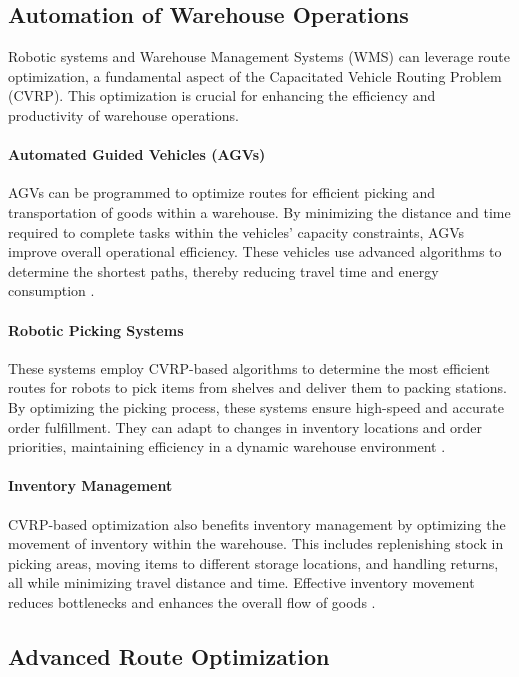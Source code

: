 \documentclass{article}
\begin{document}
    \subsection{Automation of Warehouse Operations}\label{subsec:automation-of-warehouse-operations}

    Robotic systems and Warehouse Management Systems (WMS) can leverage route optimization, a fundamental aspect of the Capacitated Vehicle Routing Problem (CVRP). This optimization is crucial for enhancing the efficiency and productivity of warehouse operations.

    \paragraph{Automated Guided Vehicles (AGVs)}
    AGVs can be programmed to optimize routes for efficient picking and transportation of goods within a warehouse. By minimizing the distance and time required to complete tasks within the vehicles' capacity constraints, AGVs improve overall operational efficiency. These vehicles use advanced algorithms to determine the shortest paths, thereby reducing travel time and energy consumption . \cite{toth2014vehicle}

    \paragraph{Robotic Picking Systems}
    These systems employ CVRP-based algorithms to determine the most efficient routes for robots to pick items from shelves and deliver them to packing stations. By optimizing the picking process, these systems ensure high-speed and accurate order fulfillment. They can adapt to changes in inventory locations and order priorities, maintaining efficiency in a dynamic warehouse environment .

    \paragraph{Inventory Management}
    CVRP-based optimization also benefits inventory management by optimizing the movement of inventory within the warehouse. This includes replenishing stock in picking areas, moving items to different storage locations, and handling returns, all while minimizing travel distance and time. Effective inventory movement reduces bottlenecks and enhances the overall flow of goods .

    \subsection*{Advanced Route Optimization}
\end{document}
